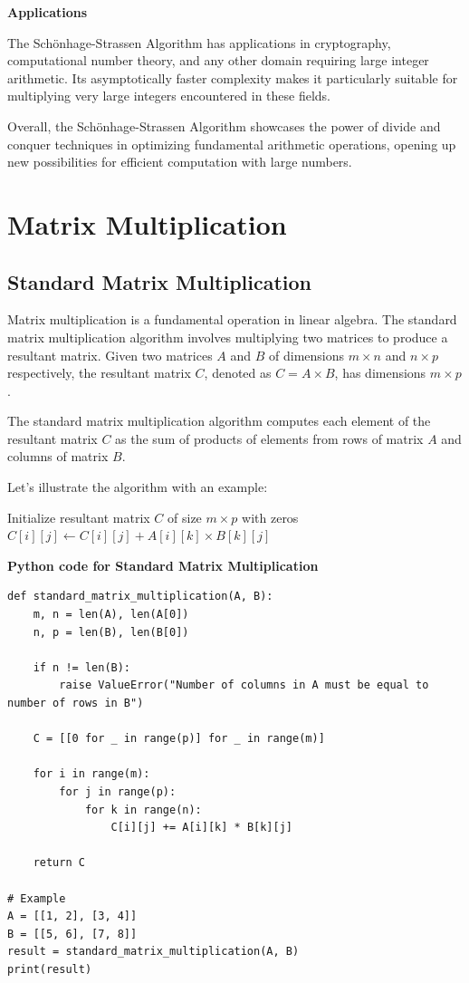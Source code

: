 \documentclass[12pt]{book} %
\begin{document}
\textbf{Applications}

The Schönhage-Strassen Algorithm has applications in cryptography, computational number theory, and any other domain requiring large integer arithmetic. Its asymptotically faster complexity makes it particularly suitable for multiplying very large integers encountered in these fields.

Overall, the Schönhage-Strassen Algorithm showcases the power of divide and conquer techniques in optimizing fundamental arithmetic operations, opening up new possibilities for efficient computation with large numbers.

\section{Matrix Multiplication}
\subsection{Standard Matrix Multiplication}
Matrix multiplication is a fundamental operation in linear algebra. 
The standard matrix multiplication algorithm involves multiplying two matrices to produce a resultant matrix. 
Given two matrices $A$ and $B$ of dimensions $m \times n$ and $n \times p$ respectively, 
the resultant matrix $C$, denoted as $C = A \times B$, has dimensions $m \times p$.

The standard matrix multiplication algorithm computes each element of the resultant matrix $C$ as the sum of products of elements from rows of matrix $A$ and columns of matrix $B$.

Let's illustrate the algorithm with an example:
\FloatBarrier
\begin{algorithm}
\caption{Standard Matrix Multiplication}
\begin{algorithmic}[1]
\State Initialize resultant matrix $C$ of size $m \times p$ with zeros
            \State $C[i][j] \gets C[i][j] + A[i][k] \times B[k][j]$
        \EndFor
    \EndFor
\EndFor
\end{algorithmic}
\end{algorithm}
\FloatBarrier
\textbf{Python code for Standard Matrix Multiplication}
\FloatBarrier
\begin{lstlisting}
def standard_matrix_multiplication(A, B):
    m, n = len(A), len(A[0])
    n, p = len(B), len(B[0])
    
    if n != len(B):
        raise ValueError("Number of columns in A must be equal to number of rows in B")
    
    C = [[0 for _ in range(p)] for _ in range(m)]
    
    for i in range(m):
        for j in range(p):
            for k in range(n):
                C[i][j] += A[i][k] * B[k][j]
    
    return C

# Example
A = [[1, 2], [3, 4]]
B = [[5, 6], [7, 8]]
result = standard_matrix_multiplication(A, B)
print(result)
\end{lstlisting}
\end{document}
